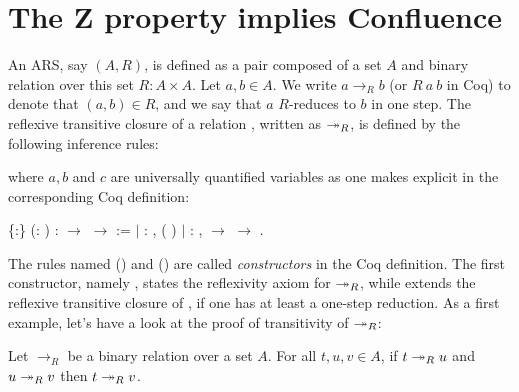\section{The Z property implies Confluence}




  An ARS, say $(A,R)$, is defined as a pair composed of a set $A$ and
  binary relation over this set $R:A\times A$. Let $a,b\in A$. We
  write $a\to_R b$ (or $R\ a\ b$ in Coq) to denote that $(a,b)\in R$,
  and we say that $a$ $R$-reduces to $b$ in one step. The reflexive
  transitive closure of a relation , written as $\twoheadrightarrow_R$, is
  defined by the following inference rules:  \noindent where $a,b$ and $c$ are universally
  quantified variables as one makes explicit in the corresponding Coq
  definition: \begin{coqdoccode}
\coqdocemptyline
\coqdocnoindent
{}  \{:\} (:  ) :  \ensuremath{\rightarrow}  \ensuremath{\rightarrow}  :=\coqdoceol
\coqdocnoindent
\ensuremath{|} : \coqdockw{\ensuremath{\forall}} , ( )  \coqdoceol
\coqdocnoindent
\ensuremath{|} : \coqdockw{\ensuremath{\forall}}   ,    \ensuremath{\rightarrow}     \ensuremath{\rightarrow}    .\coqdoceol
\coqdocemptyline
\end{coqdoccode}
The rules named () and () are called \textit{constructors}
in the Coq definition. The first constructor, namely , states
the reflexivity axiom for $\twoheadrightarrow_R$, while  extends the
reflexive transitive closure of , if one has at least a one-step
reduction. As a first example, let's have a look at the proof of
transitivity of $\twoheadrightarrow_R$:


\begin{lemma} Let $\to_R$ be a binary relation over a set $A$. For
all $t, u, v \in A$, if $t \twoheadrightarrow_R u$ and $u \twoheadrightarrow_R v$ then $t \twoheadrightarrow_R
v$.  \end{lemma}


